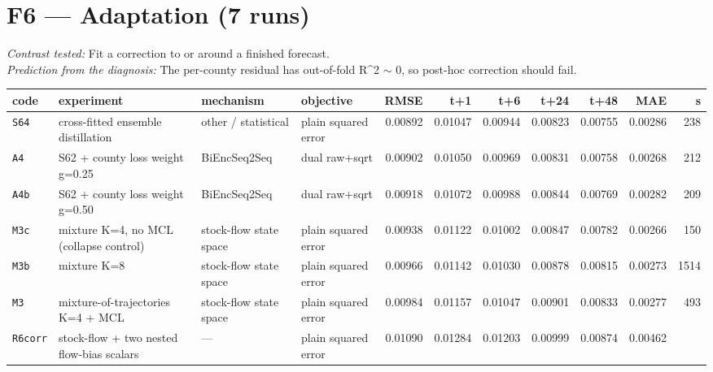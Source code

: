 \documentclass[9pt,landscape]{article}
\begin{document}
\section*{F6 --- Adaptation (7 runs)}
\noindent\emph{Contrast tested:} Fit a correction to or around a finished forecast.\\
\emph{Prediction from the diagnosis:} The per-county residual has out-of-fold R\^{}2 $\sim$ 0, so post-hoc correction should fail.
\vspace{2pt}
\begin{longtable}{@{}p{1.1cm}p{5.4cm}p{3.1cm}p{2.7cm}rrrrrrr@{}}
\toprule code & experiment & mechanism & objective & RMSE & t+1 & t+6 & t+24 & t+48 & MAE & s \\ \midrule \endhead
\texttt{S64} & cross-fitted ensemble distillation & other / statistical & plain squared error & 0.00892 & 0.01047 & 0.00944 & 0.00823 & 0.00755 & 0.00286 & 238 \\
\texttt{A4} & S62 + county loss weight g=0.25 & BiEncSeq2Seq & dual raw+sqrt & 0.00902 & 0.01050 & 0.00969 & 0.00831 & 0.00758 & 0.00268 & 212 \\
\texttt{A4b} & S62 + county loss weight g=0.50 & BiEncSeq2Seq & dual raw+sqrt & 0.00918 & 0.01072 & 0.00988 & 0.00844 & 0.00769 & 0.00282 & 209 \\
\texttt{M3c} & mixture K=4, no MCL (collapse control) & stock-flow state space & plain squared error & 0.00938 & 0.01122 & 0.01002 & 0.00847 & 0.00782 & 0.00266 & 150 \\
\texttt{M3b} & mixture K=8 & stock-flow state space & plain squared error & 0.00966 & 0.01142 & 0.01030 & 0.00878 & 0.00815 & 0.00273 & 1514 \\
\texttt{M3} & mixture-of-trajectories K=4 + MCL & stock-flow state space & plain squared error & 0.00984 & 0.01157 & 0.01047 & 0.00901 & 0.00833 & 0.00277 & 493 \\
\rowcolor{gray!15}\texttt{R6corr} & stock-flow + two nested flow-bias scalars & — & plain squared error & 0.01090 & 0.01284 & 0.01203 & 0.00999 & 0.00874 & 0.00462 &  \\
\bottomrule\end{longtable}
\end{document}
